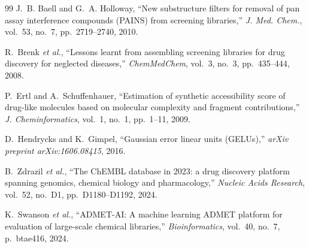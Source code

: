 \documentclass[conference]{IEEEtran}
\begin{document}
\begin{thebibliography}{99}
J.~B. Baell and G.~A. Holloway, ``New substructure filters for removal of pan assay interference compounds (PAINS) from screening libraries,'' \textit{J. Med. Chem.}, vol.~53, no.~7, pp.~2719--2740, 2010.

R.~Brenk \textit{et al.}, ``Lessons learnt from assembling screening libraries for drug discovery for neglected diseases,'' \textit{ChemMedChem}, vol.~3, no.~3, pp.~435--444, 2008.

P.~Ertl and A.~Schuffenhauer, ``Estimation of synthetic accessibility score of drug-like molecules based on molecular complexity and fragment contributions,'' \textit{J. Cheminformatics}, vol.~1, no.~1, pp.~1--11, 2009.

D.~Hendrycks and K.~Gimpel, ``Gaussian error linear units (GELUs),'' \textit{arXiv preprint arXiv:1606.08415}, 2016.

B.~Zdrazil \textit{et al.}, ``The ChEMBL database in 2023: a drug discovery platform spanning genomics, chemical biology and pharmacology,'' \textit{Nucleic Acids Research}, vol.~52, no.~D1, pp.~D1180--D1192, 2024.

K.~Swanson \textit{et al.}, ``ADMET-AI: A machine learning ADMET platform for evaluation of large-scale chemical libraries,'' \textit{Bioinformatics}, vol.~40, no.~7, p.~btae416, 2024.

\end{thebibliography}
\end{document}
